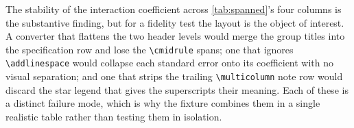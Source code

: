 \documentclass[11pt]{article}
\begin{document}
The stability of the interaction coefficient across \cref{tab:spanned}'s four
columns is the substantive finding, but for a fidelity test the layout is the
object of interest. A converter that flattens the two header levels would merge
the group titles into the specification row and lose the \verb|\cmidrule|
spans; one that ignores \verb|\addlinespace| would collapse each standard error
onto its coefficient with no visual separation; and one that strips the trailing
\verb|\multicolumn| note row would discard the star legend that gives the
superscripts their meaning. Each of these is a distinct failure mode, which is
why the fixture combines them in a single realistic table rather than testing
them in isolation.
\end{document}
